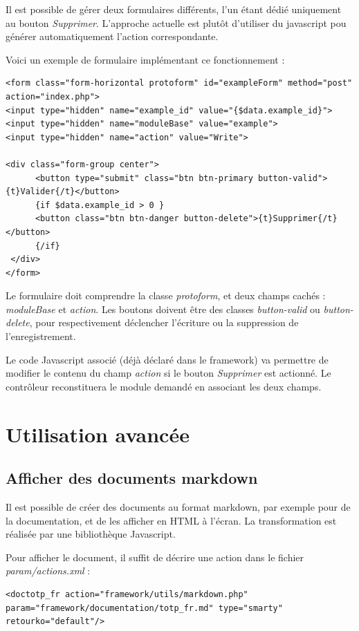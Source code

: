 Il est possible de gérer deux formulaires différents, l'un étant dédié uniquement au bouton \textit{Supprimer}. L'approche actuelle est plutôt d'utiliser du javascript pou générer automatiquement l'action correspondante.

Voici un exemple de formulaire implémentant ce fonctionnement :

\begin{lstlisting}
<form class="form-horizontal protoform" id="exampleForm" method="post" action="index.php">
<input type="hidden" name="example_id" value="{$data.example_id}">
<input type="hidden" name="moduleBase" value="example">
<input type="hidden" name="action" value="Write">

<div class="form-group center">
      <button type="submit" class="btn btn-primary button-valid">{t}Valider{/t}</button>
      {if $data.example_id > 0 }
      <button class="btn btn-danger button-delete">{t}Supprimer{/t}</button>
      {/if}
 </div>
</form>
\end{lstlisting}

Le formulaire doit comprendre la classe \textit{protoform}, et deux champs cachés : \textit{moduleBase} et \textit{action}. Les boutons doivent être des classes \textit{button-valid} ou \textit{button-delete}, pour respectivement déclencher l'écriture ou la suppression de l'enregistrement.

Le code Javascript associé (déjà déclaré dans le framework) va permettre de modifier le contenu du champ \textit{action} si le bouton \textit{Supprimer} est actionné. Le contrôleur reconstituera le module demandé en associant les deux champs.

\chapter{Utilisation avancée}

\section{Afficher des documents markdown}

Il est possible de créer des documents au format markdown, par exemple pour de la documentation, et de les afficher en HTML à l'écran. La transformation est réalisée par une bibliothèque Javascript.

Pour afficher le document, il suffit de décrire une action dans le fichier \textit{param/actions.xml} :

\begin{lstlisting}
<doctotp_fr action="framework/utils/markdown.php" param="framework/documentation/totp_fr.md" type="smarty" retourko="default"/>
\end{lstlisting}

